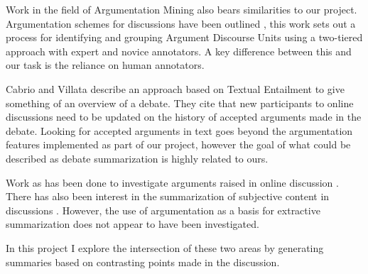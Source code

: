     Work in the field of Argumentation Mining also bears similarities to our project. Argumentation schemes for discussions have been outlined \cite{ghosh2014analyzing}, this work sets out a process for identifying and grouping Argument Discourse Units using a two-tiered approach with expert and novice annotators. A key difference between this and our task is the reliance on human annotators.

    Cabrio and Villata \cite{cabrio2012combining} describe an approach based on Textual Entailment to give something of an overview of a debate. They cite that new participants to online discussions need to be updated on the history of accepted arguments made in the debate. Looking for accepted arguments in text goes beyond the argumentation features implemented as part of our project, however the goal of what could be described as debate summarization is highly related to ours.

    Work as has been done to investigate arguments raised in online discussion \cite{boltuzic2015identifying,cabrio2012combining,ghosh2014analyzing}. There has also been interest in the summarization of subjective content in discussions \cite{hu2004mining,lloret2009towards,galley2004identifying}. However, the use of argumentation as a basis for extractive summarization does not appear to have been investigated.

    In this project I explore the intersection of these two areas by generating summaries based on contrasting points made in the discussion.
